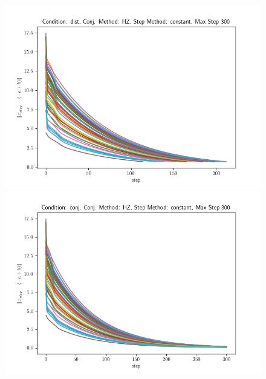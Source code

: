 \documentclass[a4paper,twocolumn,12pt]{article}
\begin{document}
{\begin{figure}[h]
    \begin{minipage}[h]{0.49\linewidth}
      \includegraphics[width=1\linewidth]{./imgs/img7.png}
    \end{minipage}
    \hfill      
    \begin{minipage}[h]{0.49\linewidth}
      \includegraphics[width=1\linewidth]{./imgs/img8.png}
    \end{minipage}
  \end{figure}

  }
\end{document}
